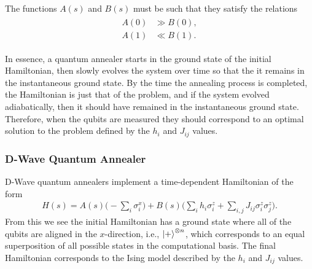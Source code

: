 The functions \( A(s) \) and \( B(s) \) must be such that they satisfy the relations
\begin{align}
\begin{split}
    A(0) &\gg B(0), \\
    A(1) &\ll B(1).
\end{split}
\end{align}

In essence, a quantum annealer starts in the ground state of the initial Hamiltonian, then slowly evolves the system over time so that the it remains in the instantaneous ground state.
By the time the annealing process is completed, the Hamiltonian is just that of the problem, and if the system evolved adiabatically, then it should have remained in the instantaneous ground state.
Therefore, when the qubits are measured they should correspond to an optimal solution to the problem defined by the \( h_i \) and \( J_{ij} \) values.

\subsubsection{D-Wave Quantum Annealer}
D-Wave quantum annealers implement a time-dependent Hamiltonian of the form~\cite{dwave_qa}
\begin{align}
    H(s) = A(s) \bigg( -\sum_i \sigma_i^x \bigg) + B(s) \bigg( \sum_i h_i \sigma_i^z + \sum_{i,j} J_{ij} \sigma_i^z \sigma_j^z \bigg).
\end{align}
From this we see the initial Hamiltonian has a ground state where all of the qubits are aligned in the \( x \)-direction, i.e., \( \ket{+}^{\otimes n} \), which corresponds to an equal superposition of all possible states in the computational basis.
The final Hamiltonian corresponds to the Ising model described by the \( h_i \) and \( J_{ij} \) values.

